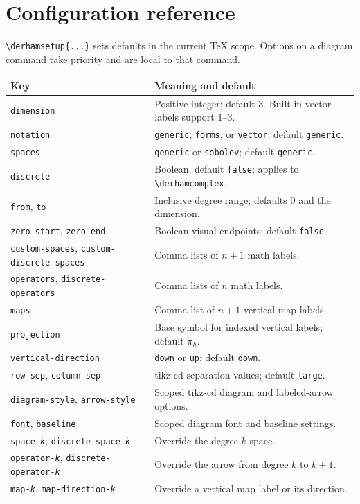 \documentclass[11pt,a4paper]{article}
\newcommand\pkg[1]{\textsf{#1}}
\newcommand\opt[1]{\texttt{#1}}
\begin{document}
\section{Configuration reference}
\verb|\derhamsetup{...}| sets defaults in the current TeX scope. Options on a diagram command take priority and are local to that command.
\begin{longtable}{@{}>{\raggedright\arraybackslash}p{.42\linewidth}>{\raggedright\arraybackslash}p{.5\linewidth}@{}}\toprule
Key & Meaning and default \\ \midrule\endhead
\opt{dimension} & Positive integer; default 3. Built-in vector labels support 1--3.\\
\opt{notation} & \opt{generic}, \opt{forms}, or \opt{vector}; default \opt{generic}.\\
\opt{spaces} & \opt{generic} or \opt{sobolev}; default \opt{generic}.\\
\opt{discrete} & Boolean, default \opt{false}; applies to \verb|\derhamcomplex|.\\
\opt{from}, \opt{to} & Inclusive degree range; defaults 0 and the dimension.\\
\opt{zero-start}, \opt{zero-end} & Boolean visual endpoints; default \opt{false}.\\
\opt{custom-spaces}, \opt{custom-discrete-spaces} & Comma lists of $n+1$ math labels.\\
\opt{operators}, \opt{discrete-operators} & Comma lists of $n$ math labels.\\
\opt{maps} & Comma list of $n+1$ vertical map labels.\\
\opt{projection} & Base symbol for indexed vertical labels; default $\pi_h$.\\
\opt{vertical-direction} & \opt{down} or \opt{up}; default \opt{down}.\\
\opt{row-sep}, \opt{column-sep} & \pkg{tikz-cd} separation values; default \opt{large}.\\
\opt{diagram-style}, \opt{arrow-style} & Scoped \pkg{tikz-cd} diagram and labeled-arrow options.\\
\opt{font}, \opt{baseline} & Scoped diagram font and baseline settings.\\
\opt{space-\emph{k}}, \opt{discrete-space-\emph{k}} & Override the degree-$k$ space.\\
\opt{operator-\emph{k}}, \opt{discrete-operator-\emph{k}} & Override the arrow from degree $k$ to $k+1$.\\
\opt{map-\emph{k}}, \opt{map-direction-\emph{k}} & Override a vertical map label or its direction.\\

\end{longtable}
\end{document}
